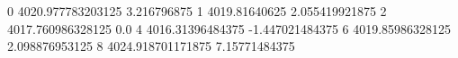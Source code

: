 0 4020.977783203125 3.216796875
1 4019.81640625 2.055419921875
2 4017.760986328125 0.0
4 4016.31396484375 -1.447021484375
6 4019.85986328125 2.098876953125
8 4024.918701171875 7.15771484375
